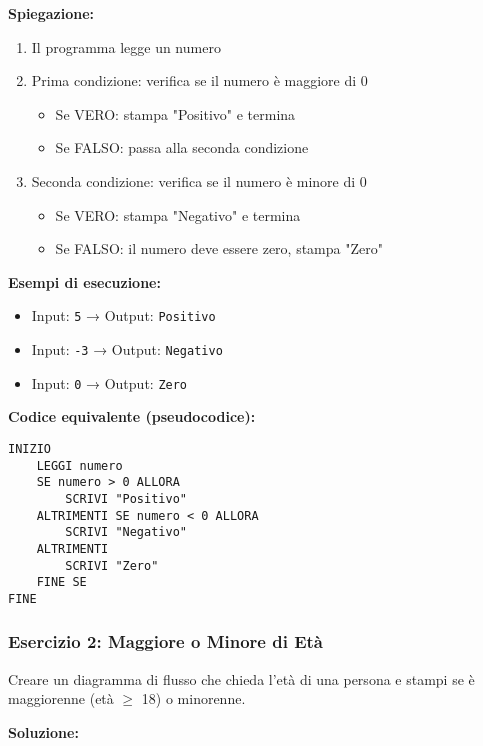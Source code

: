 \documentclass[a4paper,16pt]{article}
\begin{document}
\textbf{Spiegazione:}
\begin{enumerate}
    \item Il programma legge un numero
    \item Prima condizione: verifica se il numero è maggiore di 0
    \begin{itemize}
        \item Se VERO: stampa "Positivo" e termina
        \item Se FALSO: passa alla seconda condizione
    \end{itemize}
    \item Seconda condizione: verifica se il numero è minore di 0
    \begin{itemize}
        \item Se VERO: stampa "Negativo" e termina
        \item Se FALSO: il numero deve essere zero, stampa "Zero"
    \end{itemize}
\end{enumerate}

\textbf{Esempi di esecuzione:}
\begin{itemize}
    \item Input: \texttt{5} → Output: \texttt{Positivo}
    \item Input: \texttt{-3} → Output: \texttt{Negativo}
    \item Input: \texttt{0} → Output: \texttt{Zero}
\end{itemize}

\textbf{Codice equivalente (pseudocodice):}
\begin{lstlisting}
INIZIO
    LEGGI numero
    SE numero > 0 ALLORA
        SCRIVI "Positivo"
    ALTRIMENTI SE numero < 0 ALLORA
        SCRIVI "Negativo"
    ALTRIMENTI
        SCRIVI "Zero"
    FINE SE
FINE
\end{lstlisting}

\newpage
\subsubsection{Esercizio 2: Maggiore o Minore di Età}

\begin{tcolorbox}[colback=blue!5!white,colframe=blue!75!black,title=Traccia]
Creare un diagramma di flusso che chieda l'età di una persona e stampi se è maggiorenne (età $\geq$ 18) o minorenne.
\end{tcolorbox}

\textbf{Soluzione:}
\end{document}
